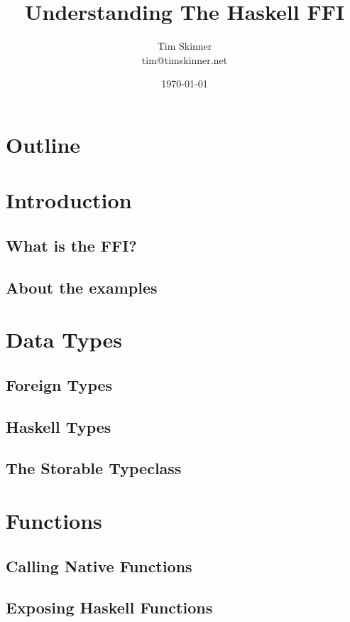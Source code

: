 \documentclass{beamer}
\title{Understanding The Haskell FFI}
\author{Tim Skinner \\ {\small tim@timskinner.net}}
\date{\today}
\begin{document}
\begin{frame}
    \titlepage
\end{frame}

\section*{Outline}
\begin{frame}
    \begin{tiny}
        \tableofcontents
    \end{tiny}
\end{frame}

\section{Introduction}
\subsection{What is the FFI?}
\subsection{About the examples}

\section{Data Types}
\subsection{Foreign Types}
\subsection{Haskell Types}
\subsection{The Storable Typeclass}

\section{Functions}
\subsection{Calling Native Functions}
\subsection{Exposing Haskell Functions}
\end{document}
